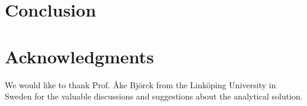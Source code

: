 \documentclass[conference]{IEEEtran}
\begin{document}
  \section{Conclusion} \label{sec:conclusion}
  

  \section{Acknowledgments}
  We would like to thank Prof. {\AA}ke Bj\"{o}rck from the Link\"{o}ping University in Sweden for the valuable discussions and suggestions about the analytical solution.

  
\end{document}
